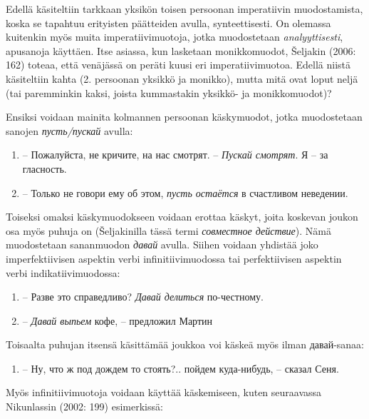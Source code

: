 \documentclass[]{scrreprt}
\providecommand{\tightlist}{%
  \setlength{\itemsep}{0pt}\setlength{\parskip}{0pt}}
\begin{document}
Edellä käsiteltiin tarkkaan yksikön toisen persoonan imperatiivin
muodostamista, koska se tapahtuu erityisten päätteiden avulla,
synteettisesti. On olemassa kuitenkin myös muita imperatiivimuotoja,
jotka muodostetaan \emph{analyyttisesti}, apusanoja käyttäen. Itse
asiassa, kun lasketaan monikkomuodot, Šeljakin (2006: 162) toteaa, että
venäjässä on peräti kuusi eri imperatiivimuotoa. Edellä niistä
käsiteltiin kahta (2. persoonan yksikkö ja monikko), mutta mitä ovat
loput neljä (tai paremminkin kaksi, joista kummastakin yksikkö- ja
monikkomuodot)?

Ensiksi voidaan mainita kolmannen persoonan käskymuodot, jotka
muodostetaan sanojen \emph{пусть/пускай} avulla:

\begin{enumerate}
\def\labelenumi{(\arabic{enumi})}
\setcounter{enumi}{355}
\tightlist
\item
  -- Пожалуйста, не кричите, на нас смотрят. -- \emph{Пускай смотрят}. Я
  -- за гласность.
\item
  -- Только не говори ему об этом, \emph{пусть остаётся} в счастливом
  неведении.
\end{enumerate}

Toiseksi omaksi käskymuodokseen voidaan erottaa käskyt, joita koskevan
joukon osa myös puhuja on (Šeljakinilla tässä termi \emph{совместное
действие}). Nämä muodostetaan sananmuodon \emph{давай} avulla. Siihen
voidaan yhdistää joko imperfektiivisen aspektin verbi
infinitiivimuodossa tai perfektiivisen aspektin verbi
indikatiivimuodossa:

\begin{enumerate}
\def\labelenumi{(\arabic{enumi})}
\setcounter{enumi}{357}
\tightlist
\item
  -- Разве это справедливо? \emph{Давай делиться} по-честному.
\item
  -- \emph{Давай выпьем} кофе, -- предложил Мартин
\end{enumerate}

Toisaalta puhujan itsensä käsittämää joukkoa voi käskeä myös ilman
давай-sanaa:

\begin{enumerate}
\def\labelenumi{(\arabic{enumi})}
\setcounter{enumi}{359}
\tightlist
\item
  -- Ну, что ж под дождем то стоять?.. пойдем куда-нибудь, -- сказал
  Сеня.
\end{enumerate}

Myös infinitiivimuotoja voidaan käyttää käskemiseen, kuten seuraavassa
Nikunlassin (2002: 199) esimerkissä:
\end{document}
